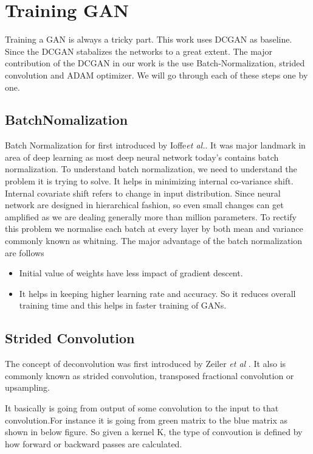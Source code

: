 \section{Training GAN}

Training a GAN is always a tricky part. This work uses DCGAN\cite{DCGAN} as baseline. Since the DCGAN stabalizes the networks to a great extent. The major contribution of the DCGAN in our work is the use Batch-Normalization, strided convolution and ADAM optimizer. We will go through each of these steps one by one.
\subsection{BatchNomalization}

Batch Normalization for first introduced by Ioffe\textit{et al.}\cite{BatchNorm}. It was major landmark in area of deep learning as most deep neural network today's contains batch normalization. 
To understand batch normalization, we need to understand the problem it is trying to solve. It helps in minimizing internal co-variance shift. Internal covariate shift refers to change in input distribution. Since neural network are designed in hierarchical fashion, so even small changes can get amplified as we are dealing generally more than million parameters. To rectify this problem we normalise each batch at every layer by both mean and variance commonly known as whitning. The major advantage of the batch normalization are follows
\begin{itemize}
    \item Initial value of weights have less impact of gradient descent.
    \item It helps in keeping higher learning rate and accuracy. So it reduces overall training time and this helps in faster training of GANs.
\end{itemize}

\subsection{Strided Convolution}

The concept of deconvolution was first introduced by Zeiler \textit{et al} \cite{Deconv}. It also is commonly known as  strided convolution, transposed fractional convolution or upsampling.



\par
It basically is going from output of some convolution to the input to that convolution.For instance it is going from green matrix to the blue matrix as shown in below figure. So given a kernel K, the type of convoution is defined by how forward or backward passes are calculated\cite{Deconv-Theano}.

